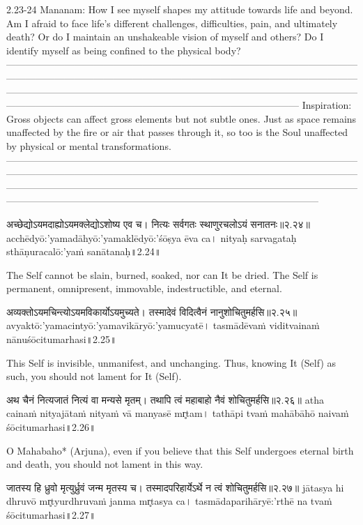 2.23-24 Mananam:
How I see myself shapes my attitude towards life and beyond. Am I afraid to face life’s different challenges, difficulties, pain, and ultimately death? Or do I maintain an unshakeable vision of myself and others? Do I identify myself as being confined to the physical body?
—---------------------------------------------------------------------------------------------------------------------------------------------------------------------------------------------------------------------------------------------------------------------------------------------------------------------------------------------------------------------------------------------------------------------------
 Inspiration:
Gross objects can affect gross elements but not subtle ones. Just as space remains unaffected by the fire or air that passes through it, so too is the Soul unaffected by physical or mental transformations.
—---------------------------------------------------------------------------------------------------------------------------------------------------------------------------------------------------------------------------------------------------------------------------------------------------------------------------------------------------------------------------------------------------------------------------------

अच्छेद्योऽयमदाह्योऽयमक्लेद्योऽशोष्य एव च। 
नित्यः सर्वगतः स्थाणुरचलोऽयं सनातनः॥२.२४॥
acchēdyō:'yamadāhyō:'yamaklēdyō:'śōṣya ēva ca। 
nityaḥ sarvagataḥ sthāṇuracalō:'yaṁ sanātanaḥ॥2.24॥

The Self cannot be slain, burned, soaked, nor can It be dried. The Self is permanent, omnipresent, immovable, indestructible, and eternal.


अव्यक्तोऽयमचिन्त्योऽयमविकार्योऽयमुच्यते।
 तस्मादेवं विदित्वैनं नानुशोचितुमर्हसि॥२.२५॥
avyaktō:'yamacintyō:'yamavikāryō:'yamucyatē।
tasmādēvaṁ viditvainaṁ nānuśōcitumarhasi॥2.25॥

This Self is invisible, unmanifest, and unchanging. Thus, knowing It (Self) as such, you should not lament for It (Self).

अथ चैनं नित्यजातं नित्यं वा मन्यसे मृतम्।
 तथापि त्वं महाबाहो नैवं शोचितुमर्हसि॥२.२६॥
atha cainaṁ nityajātaṁ nityaṁ vā manyasē mr̥tam।
tathāpi tvaṁ mahābāhō naivaṁ śōcitumarhasi॥2.26॥

O Mahabaho* (Arjuna), even if you believe that this Self undergoes eternal birth and death, you should not lament in this way. 


जातस्य हि ध्रुवो मृत्युर्ध्रुवं जन्म मृतस्य च। 
तस्मादपरिहार्येऽर्थे न त्वं शोचितुमर्हसि॥२.२७॥
jātasya hi dhruvō mr̥tyurdhruvaṁ janma mr̥tasya ca। 
tasmādaparihāryē:'rthē na tvaṁ śōcitumarhasi॥2.27॥

